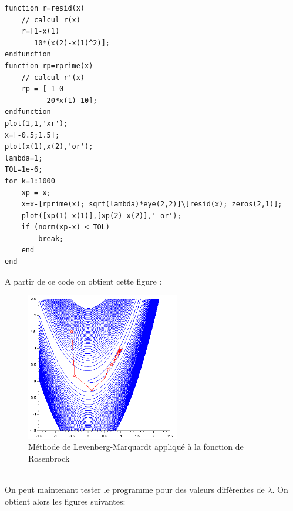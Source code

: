         \begin{center}
          \begin{verbatim}
function r=resid(x) 
    // calcul r(x)
    r=[1-x(1)
       10*(x(2)-x(1)^2)];
endfunction
function rp=rprime(x) 
    // calcul r'(x)
    rp = [-1 0
         -20*x(1) 10];
endfunction
plot(1,1,'xr');
x=[-0.5;1.5];
plot(x(1),x(2),'or');
lambda=1;
TOL=1e-6;
for k=1:1000
    xp = x;
    x=x-[rprime(x); sqrt(lambda)*eye(2,2)]\[resid(x); zeros(2,1)];
    plot([xp(1) x(1)],[xp(2) x(2)],'-or');
    if (norm(xp-x) < TOL)
        break;
    end
end
          \end{verbatim}
                \label{lst:code_12}
         \end{center}
         A partir de ce code on obtient cette figure : 
         \begin{figure}[h]
              \centering
              \captionsetup{font=small}
                \includegraphics[width=0.6\textwidth]{images/LM1.png}
              \caption{Méthode de Levenberg-Marquardt appliqué à la fonction de Rosenbrock}
              \label{fig:LM1}
            \end{figure}
            \\
            On peut maintenant tester le programme pour des valeurs différentes de $\lambda$. On obtient alors les figures suivantes:
            \newpage
